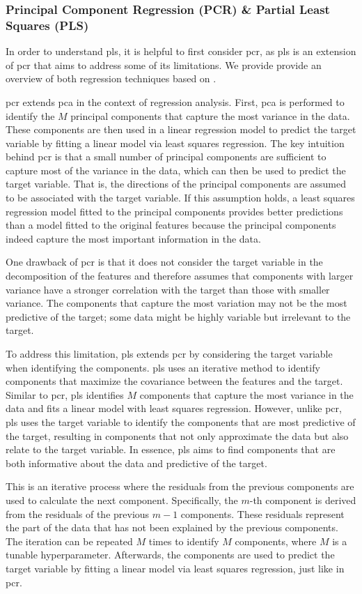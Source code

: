 \subsubsection{Principal Component Regression (PCR) \& Partial Least Squares (PLS)}\label{subsec:pls}
In order to understand \gls{pls}, it is helpful to first consider \gls{pcr}, as \gls{pls} is an extension of \gls{pcr} that aims to address some of its limitations.
We provide provide an overview of both regression techniques based on \citet{James2023AnIS}.

\gls{pcr} extends \gls{pca} in the context of regression analysis.
First, \gls{pca} is performed to identify the $M$ principal components that capture the most variance in the data.
These components are then used in a linear regression model to predict the target variable by fitting a linear model via least squares regression.
The key intuition behind \gls{pcr} is that a small number of principal components are sufficient to capture most of the variance in the data, which can then be used to predict the target variable.
That is, the directions of the principal components are assumed to be associated with the target variable.
If this assumption holds, a least squares regression model fitted to the principal components provides better predictions than a model fitted to the original features because the principal components indeed capture the most important information in the data.

One drawback of \gls{pcr} is that it does not consider the target variable in the decomposition of the features and therefore assumes that components with larger variance have a stronger correlation with the target than those with smaller variance.
The components that capture the most variation may not be the most predictive of the target; some data might be highly variable but irrelevant to the target.

To address this limitation, \gls{pls} extends \gls{pcr} by considering the target variable when identifying the components.
\gls{pls} uses an iterative method to identify components that maximize the covariance between the features and the target.
Similar to \gls{pcr}, \gls{pls} identifies $M$ components that capture the most variance in the data and fits a linear model with least squares regression.
However, unlike \gls{pcr}, \gls{pls} uses the target variable to identify the components that are most predictive of the target, resulting in components that not only approximate the data but also relate to the target variable.
In essence, \gls{pls} aims to find components that are both informative about the data and predictive of the target.

This is an iterative process where the residuals from the previous components are used to calculate the next component.
Specifically, the $m$-th component is derived from the residuals of the previous $m-1$ components.
These residuals represent the part of the data that has not been explained by the previous components.
The iteration can be repeated $M$ times to identify $M$ components, where $M$ is a tunable hyperparameter.
Afterwards, the components are used to predict the target variable by fitting a linear model via least squares regression, just like in \gls{pcr}.